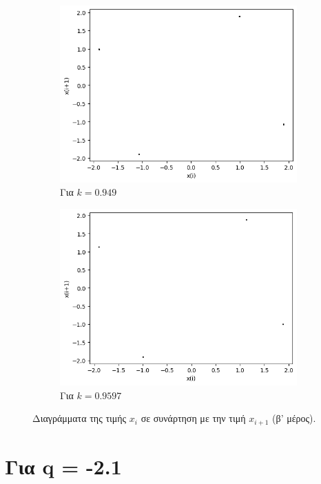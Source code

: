 \begin{figure}[ht]
\begin{subfigure}[b]{0.4\textwidth}
		\includegraphics[width=\textwidth]{LateX images/graphs q19/g13}
		\caption{Για $k=0.949$}
		\label{f:k102}
	\end{subfigure}
	\hfill
	\begin{subfigure}[b]{0.4\textwidth}
		\centering
		\includegraphics[width=\textwidth]{LateX images/graphs q19/g14}
		\caption{Για $k=0.9597$}
		\label{f:k103}
	\end{subfigure}
	\hfill
	\caption{Διαγράμματα της τιμής \(x_i\) σε συνάρτηση με την τιμή \(x_{i+1}\) (β' μέρος).}
	\label{f:k243}
\end{figure}

\clearpage

\section{Για q = -2.1}

